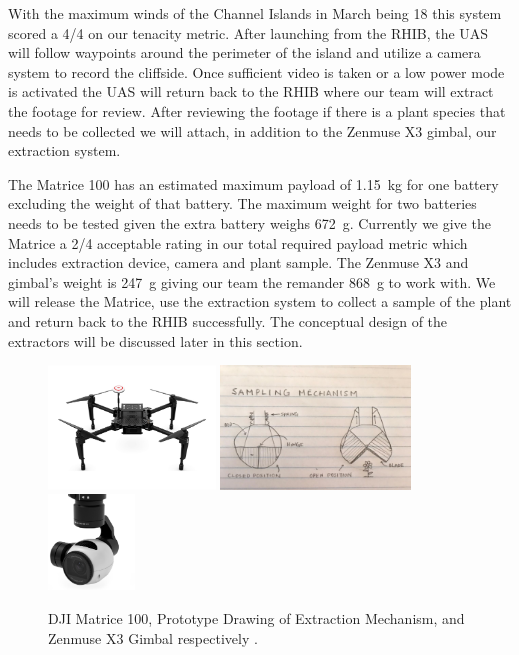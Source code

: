 \documentclass{wrcecapstone}
\begin{document}
With the maximum winds of the Channel Islands in March being \SI{18}{\mph} this system scored a 4/4 on our tenacity metric.  After launching from the RHIB, the UAS will follow waypoints around the perimeter of the island and utilize a camera system to record the cliffside. Once sufficient video is taken or a low power mode is activated the UAS will return back to the RHIB where our team will extract the footage for review.  After reviewing the footage if there is a plant species that needs to be collected we will attach, in addition to the Zenmuse X3 gimbal, our extraction system. 

The Matrice 100 has an estimated maximum payload of \SI{1.15}{\kilo\gram} for one battery excluding the weight of that battery. The maximum weight for two batteries needs to be tested given the extra battery weighs \SI{672}{\gram}. Currently we give the Matrice a  2/4 acceptable rating in our total required payload metric which includes extraction device, camera and plant sample. The Zenmuse X3 and gimbal’s weight is \SI{247}{\gram} giving our team the remander \SI{868}{\gram} to work with. We will release the Matrice, use the extraction system to collect a sample of the plant and return back to the RHIB successfully. The conceptual design of the extractors will be discussed later in this section.  
\begin{figure}
\begin{center}
\includegraphics[height=1.3in]{figures/fig411a.png}
\includegraphics[height=1.3in]{figures/fig411b.jpg}
\includegraphics[height=1in]{figures/fig411c.png}
\end{center}
\caption{DJI Matrice 100, Prototype Drawing of Extraction Mechanism, and Zenmuse X3 Gimbal respectively \cite{dronesmadeeasy2019matrice, dji2019zenmuse}.}
\label{fig:4.1.1}
\end{figure}
\end{document}
